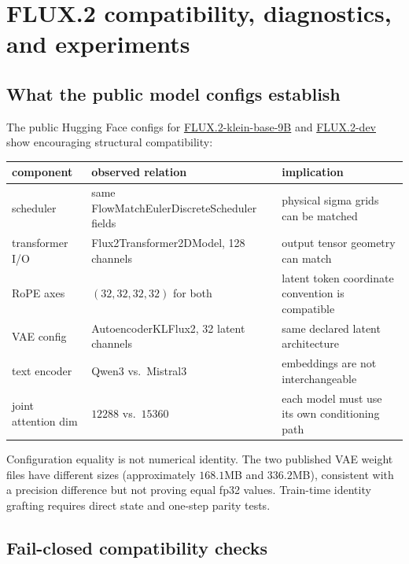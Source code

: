 \documentclass[11pt,a4paper]{article}
\theoremstyle{plain}
\theoremstyle{definition}
\begin{document}
\section{FLUX.2 compatibility, diagnostics, and experiments}
\label{sec:practice}

\subsection{What the public model configs establish}

The public Hugging Face configs for
\href{https://huggingface.co/black-forest-labs/FLUX.2-klein-base-9B}{FLUX.2-klein-base-9B}
and
\href{https://huggingface.co/black-forest-labs/FLUX.2-dev}{FLUX.2-dev}
show encouraging structural compatibility:
\begin{center}
\begin{tabular}{@{}
  >{\raggedright\arraybackslash}p{}
  >{\raggedright\arraybackslash}p{}
  >{\raggedright\arraybackslash}p{}
@{}}
\toprule
component & observed relation & implication\\
\midrule
scheduler & same FlowMatchEulerDiscreteScheduler fields & physical sigma grids can be matched\\
transformer I/O & Flux2Transformer2DModel, 128 channels & output tensor geometry can match\\
RoPE axes & $(32,32,32,32)$ for both & latent token coordinate convention is compatible\\
VAE config & AutoencoderKLFlux2, 32 latent channels & same declared latent architecture\\
text encoder & Qwen3 vs.\ Mistral3 & embeddings are not interchangeable\\
joint attention dim & $12288$ vs.\ $15360$ & each model must use its own conditioning path\\
\bottomrule
\end{tabular}
\end{center}

Configuration equality is not numerical identity.  The two published VAE weight files have
different sizes (approximately $168.1$MB and $336.2$MB), consistent with a precision difference
but not proving equal fp32 values.  Train-time identity grafting requires direct state and
one-step parity tests.

\subsection{Fail-closed compatibility checks}
\end{document}
